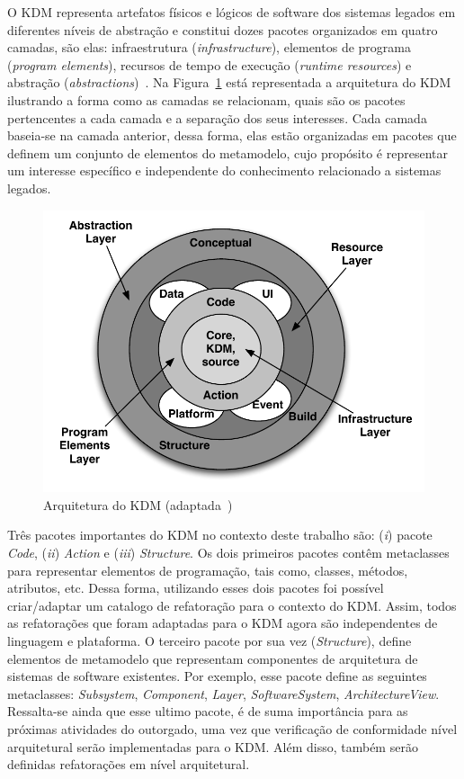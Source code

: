 O KDM representa artefatos físicos e lógicos de software dos sistemas legados em diferentes níveis de abstração e constitui dozes pacotes organizados em quatro camadas, são elas: infraestrutura (\textit{infrastructure}), elementos de programa (\textit{program elements}), recursos de tempo de execução (\textit{runtime resources}) e abstração (\textit{abstractions})~\citep{PerezCastillo:2011jo}. Na Figura~\ref{fig:KDMArchitecture} está representada a arquitetura do KDM ilustrando a forma como as camadas se relacionam, quais são os pacotes pertencentes a cada camada e a separação dos seus interesses. Cada camada baseia-se na camada anterior, dessa forma, elas estão organizadas em pacotes que definem um conjunto de elementos do metamodelo, cujo propósito é representar um interesse específico e independente do conhecimento relacionado a sistemas legados.

\begin{figure}[!ht]
\centering
  \includegraphics[scale=0.65]{figuras/Layers_packages_and_separations_of_concerns_in_KDM}
\caption{Arquitetura do KDM (adaptada~\citep{OMGADM})}
\label{fig:KDMArchitecture}
\end{figure}

Três pacotes importantes do KDM no contexto deste trabalho são: (\textit{i}) pacote \textit{Code}, (\textit{ii}) \textit{Action} e (\textit{iii}) \textit{Structure}. Os dois primeiros pacotes contêm metaclasses para representar elementos de programação, tais como, classes, métodos, atributos, etc. Dessa forma, utilizando esses dois pacotes foi possível criar/adaptar um catalogo de refatoração para o contexto do KDM. Assim, todos as refatorações que foram adaptadas para o KDM agora são independentes de linguagem e plataforma. O terceiro pacote por sua vez (\textit{Structure}), define elementos de metamodelo que representam componentes de arquitetura de sistemas de software existentes. Por exemplo, esse pacote define as seguintes metaclasses: \textit{Subsystem}, \textit{Component}, \textit{Layer}, \textit{SoftwareSystem}, \textit{ArchitectureView}. Ressalta-se ainda que esse ultimo pacote, é de suma importância para as próximas atividades do outorgado, uma vez que verificação de conformidade nível arquitetural serão implementadas para o KDM. Além disso, também serão definidas refatorações em nível arquitetural.

